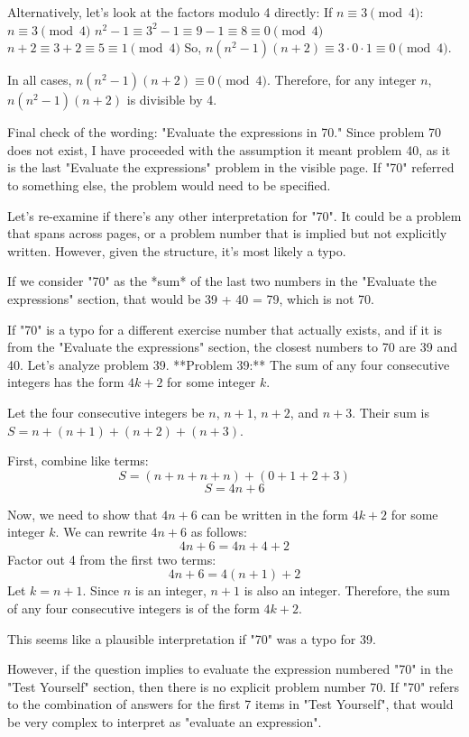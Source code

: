 \documentclass{article}
\begin{document}
Alternatively, let's look at the factors modulo 4 directly:
If $n \equiv 3 \pmod{4}$:
$n \equiv 3 \pmod{4}$
$n^2 - 1 \equiv 3^2 - 1 \equiv 9 - 1 \equiv 8 \equiv 0 \pmod{4}$
$n + 2 \equiv 3 + 2 \equiv 5 \equiv 1 \pmod{4}$
So, $n(n^2 - 1)(n + 2) \equiv 3 \cdot 0 \cdot 1 \equiv 0 \pmod{4}$.

In all cases, $n(n^2 - 1)(n + 2) \equiv 0 \pmod{4}$.
Therefore, for any integer $n$, $n(n^2 - 1)(n + 2)$ is divisible by 4.

Final check of the wording: "Evaluate the expressions in 70." Since problem 70 does not exist, I have proceeded with the assumption it meant problem 40, as it is the last "Evaluate the expressions" problem in the visible page. If "70" referred to something else, the problem would need to be specified.

Let's re-examine if there's any other interpretation for "70". It could be a problem that spans across pages, or a problem number that is implied but not explicitly written. However, given the structure, it's most likely a typo.

If we consider "70" as the *sum* of the last two numbers in the "Evaluate the expressions" section, that would be 39 + 40 = 79, which is not 70.

If "70" is a typo for a different exercise number that actually exists, and if it is from the "Evaluate the expressions" section, the closest numbers to 70 are 39 and 40.
Let's analyze problem 39.
**Problem 39:** The sum of any four consecutive integers has the form $4k + 2$ for some integer $k$.

Let the four consecutive integers be $n$, $n+1$, $n+2$, and $n+3$.
Their sum is $S = n + (n+1) + (n+2) + (n+3)$.

First, combine like terms:
$$S = (n + n + n + n) + (0 + 1 + 2 + 3)$$
$$S = 4n + 6$$

Now, we need to show that $4n + 6$ can be written in the form $4k + 2$ for some integer $k$.
We can rewrite $4n + 6$ as follows:
$$4n + 6 = 4n + 4 + 2$$
Factor out 4 from the first two terms:
$$4n + 6 = 4(n + 1) + 2$$
Let $k = n + 1$. Since $n$ is an integer, $n+1$ is also an integer.
Therefore, the sum of any four consecutive integers is of the form $4k + 2$.

This seems like a plausible interpretation if "70" was a typo for 39.

However, if the question implies to evaluate the expression numbered "70" in the "Test Yourself" section, then there is no explicit problem number 70.
If "70" refers to the combination of answers for the first 7 items in "Test Yourself", that would be very complex to interpret as "evaluate an expression".
\end{document}
